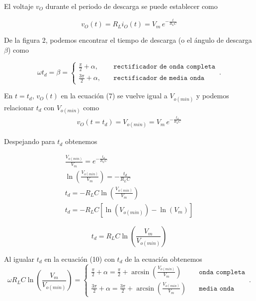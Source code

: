 \documentclass[12pt]{article}
\begin{document}
	\noindent El voltaje $v_O$ durante el periodo de descarga se puede establecer como
	\begin{tcolorbox}[colback=red!5!white,colframe=red!75!black,arc=0mm,boxrule=0mm,width=(\linewidth+0.5cm)]
		\begin{equation}
			v_O(t) = R_L i_O(t) = V_m \, e^{ -\frac{t}{R_L C} }
		\end{equation}
	\end{tcolorbox}
	
	\noindent De la figura 2, podemos encontrar el tiempo de descarga (o el ángulo de descarga $\beta$) como
	
	\begin{equation}
		\omega t_d = \beta =  
		\begin{cases}
			\frac{\pi}{2} + \alpha, \quad & \texttt{rectificador de onda completa}\\
			\frac{3\pi}{2} + \alpha, \quad & \texttt{rectificador de media onda}
		\end{cases}\,.
	\end{equation}
	
	\noindent En $t = t_d$, $v_O(t)$ en la ecuación (7) se vuelve igual a $V_{o(min)}$ y podemos relacionar $t_d$ con $V_{o(min)}$ como
	\begin{align}
		v_O (t = t_d) = V_{o(min)} = V_m \, e^{ -\frac{t_d}{R_L C} }
	\end{align}
	
	\noindent Despejando para $t_d$ obtenemos
	
	\begin{align*}
		\frac{V_{o(min)}}{V_m} = e^{ -\frac{t_d}{R_L C} }\\
		\ln{ \left( \frac{V_{o(min)}}{V_m} \right) } = - \frac{t_d}{R_L C}\\
		t_d = -R_L C \ln{ \left( \frac{V_{o(min)}}{V_m} \right) }\\
		t_d = -R_L C \left[ \ln( V_{o(min)} )- \ln (V_m) \right]
	\end{align*}
	
	\begin{tcolorbox}[colback=red!5!white,colframe=red!75!black,arc=0mm,boxrule=0mm,width=(\linewidth+0.5cm)]
		\begin{equation}
			t_d = R_L C\ln \left( \frac{V_m}{V_{o(min)}} \right)
		\end{equation}
	\end{tcolorbox}
	
	\noindent Al igualar $t_d$ en la ecuación (10) con $t_d$ de la ecuación obtenemos
	\begin{equation}
		\omega R_L C\ln \left( \frac{V_m}{V_{o(min)}} \right) =  
		\begin{cases}
			\frac{\pi}{2} + \alpha = \frac{\pi}{2} + \arcsin\left(  \frac{V_{o(min)}}{V_m}\right) \quad &\texttt{onda completa}\\
			\frac{3\pi}{2} + \alpha = \frac{3\pi}{2} + \arcsin\left(  \frac{V_{o(min)}}{V_m}\right) \quad &\texttt{media onda}
		\end{cases}\,.
	\end{equation}
	
\end{document}
